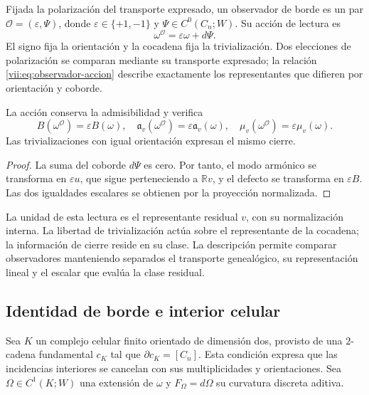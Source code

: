 \begin{definition}
\label{vii:def:observador-borde}
Fijada la polarización del transporte expresado, un observador de borde
es un par \(\mathcal O=(\varepsilon,\Psi)\), donde
\(\varepsilon\in\{+1,-1\}\) y \(\Psi\in C^0(C_n;W)\).
Su acción de lectura es
\begin{equation}
 \omega^{\mathcal O}=\varepsilon\omega+d\Psi.
 \label{vii:eq:observador-accion}
\end{equation}
El signo fija la orientación y la cocadena fija la trivialización.
Dos elecciones de polarización se comparan mediante su transporte
expresado; la relación \eqref{vii:eq:observador-accion} describe
exactamente los representantes que difieren por orientación y coborde.
\end{definition}

\begin{proposition}
\label{vii:prop:observador-covarianza}
La acción conserva la admisibilidad y verifica
\[
 B(\omega^{\mathcal O})=\varepsilon B(\omega),\quad
 \mathfrak a_v(\omega^{\mathcal O})=\varepsilon\mathfrak a_v(\omega),
 \quad \mu_v(\omega^{\mathcal O})=\varepsilon\mu_v(\omega).
\]
Las trivializaciones con igual orientación expresan el mismo cierre.
\end{proposition}

\begin{proof}
La suma del coborde \(d\Psi\) es cero. Por tanto, el modo armónico
se transforma en \(\varepsilon u\), que sigue perteneciendo a
\(\mathbb Rv\), y el defecto se transforma en \(\varepsilon B\).
Las dos igualdades escalares se obtienen por la proyección normalizada.
\end{proof}

La unidad de esta lectura es el representante residual \(v\), con su
normalización interna. La libertad de trivialización actúa sobre el
representante de la cocadena; la información de cierre reside en su
clase. La descripción permite comparar observadores manteniendo
separados el transporte genealógico, su representación lineal y el escalar
que evalúa la clase residual.

\subsection{Identidad de borde e interior celular}
\label{vii:sec:observador-stokes}

Sea \(K\) un complejo celular finito orientado de dimensión dos,
provisto de una \(2\)-cadena fundamental \(c_K\) tal que
\(\partial c_K=[C_n]\). Esta condición expresa que las incidencias
interiores se cancelan con sus multiplicidades y orientaciones.
Sea \(\Omega\in C^1(K;W)\) una extensión de \(\omega\) y
\(F_\Omega=d\Omega\) su curvatura discreta aditiva.

